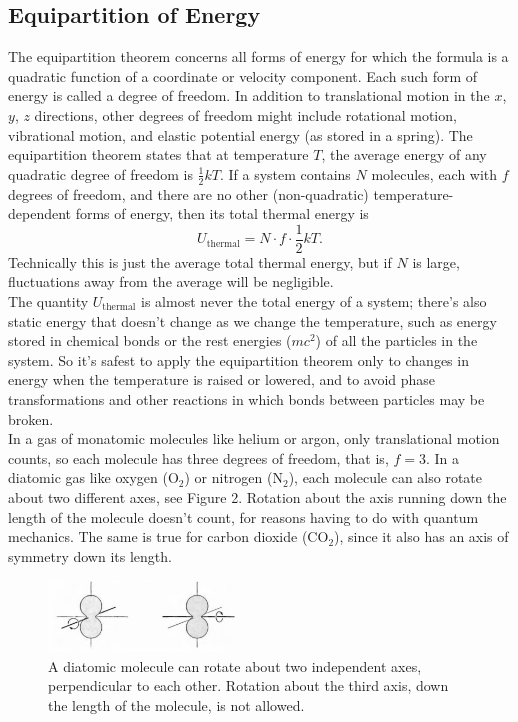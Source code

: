 \documentclass[11pt]{exam}
\begin{document}
\subsection{Equipartition of Energy}
\hspace*{10mm}The equipartition theorem concerns all forms of energy for which the formula is a quadratic function of a coordinate or velocity component. Each such form of energy is called a degree of freedom. In addition to translational motion in the $x$, $y$, $z$ directions, other degrees of freedom might include rotational motion, vibrational motion, and elastic potential energy (as stored in a spring). The equipartition theorem states that at temperature $T$, the average energy of any quadratic degree of freedom is $\frac{1}{2}kT$. If a system contains $N$ molecules, each with $f$ degrees of freedom, and there are no other (non-quadratic) temperature-dependent forms of energy, then its total thermal energy is 
\begin{equation}\tag{1.23}
U_{\text{thermal}}= N\cdot f \cdot \frac{1}{2}kT.
\end{equation}
Technically this is just the average total thermal energy, but if $N$ is large, fluctuations away from the average will be negligible.\\
\hspace*{10mm}The quantity $U_{\text{thermal}}$ is almost never the total energy of a system; there's also static energy that doesn't change as we change the temperature, such as energy stored in chemical bonds or the rest energies ($mc^2$) of all the particles in the system. So it's safest to apply the equipartition theorem only to changes in energy when the temperature is raised or lowered, and to avoid phase transformations and other reactions in which bonds between particles may be broken. \\
\hspace*{10mm}In a gas of monatomic molecules like helium or argon, only translational motion counts, so each molecule has three degrees of freedom, that is, $f=3$. In a diatomic gas like oxygen (O$_2$) or nitrogen (N$_2$), each molecule can also rotate about two different axes, see Figure 2. Rotation about the axis running down the length of the molecule doesn't count, for reasons having to do with quantum mechanics. The same is true for carbon dioxide (CO$_2$), since it also has an axis of symmetry down its length.
\begin{figure}[htp]
    \centering
    \includegraphics[width=5cm]{figure2.png}
    \caption{A diatomic molecule can rotate about two independent axes, perpendicular to each other. Rotation about the third axis, down the length of the molecule, is not allowed.}
\label{fig:diatomic_molecule}
\end{figure}\\
\end{document}
